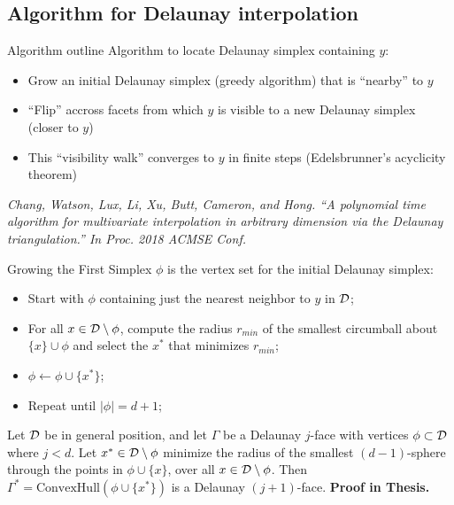 \documentclass[xcolor=dvipsnames]{beamer}
\begin{document}
\subsection{Algorithm for Delaunay interpolation}
\begin{frame}{Algorithm outline}
Algorithm to locate Delaunay simplex containing $y$:
\begin{itemize}
\item Grow an initial Delaunay simplex (greedy algorithm) that is
``nearby'' to $y$
\item ``Flip'' accross facets from which $y$ is visible to a new Delaunay
simplex (closer to $y$)
\item This ``visibility walk'' converges to $y$ in finite steps
(Edelsbrunner's acyclicity theorem)
\end{itemize}
\vfill
{\small \it Chang, Watson, Lux, Li, Xu, Butt, Cameron, and Hong.
``A polynomial time algorithm for multivariate interpolation in arbitrary
dimension via the Delaunay triangulation.''
In Proc. 2018 ACMSE Conf.}
\end{frame}
\begin{frame}{Growing the First Simplex}
$\phi$ is the vertex set for the initial Delaunay simplex:
\begin{itemize}
\item Start with $\phi$ containing just the nearest neighbor to $y$ in
${\cal D}$;
\item For all $x \in {\cal D} \setminus \phi$, compute the radius $r_{min}$ of
the smallest circumball about $\{x\} \cup \phi$ and select the $x^*$
that minimizes $r_{min}$;
\item $\phi \leftarrow \phi \cup \{x^*\}$;
\item Repeat until $|\phi| = d+1$;
\end{itemize}
\begin{lemma}
Let ${\cal D}$ be in general position, and
let $\Gamma$ be a Delaunay $j$-face with vertices $\phi \subset {\cal D}$
where $j<d$.
Let $x^* \in {\cal D} \setminus \phi$
minimize the radius of the smallest $(d-1)$-sphere through the points in
$\phi \cup \{x\}$, over all $x \in {\cal D} \setminus \phi$.
Then $\Gamma^* = \text{ConvexHull}(\phi \cup \{x^*\})$ is a Delaunay
$(j+1)$-face.
{\bf Proof in Thesis.}
\end{lemma}
\end{frame}
\end{document}
